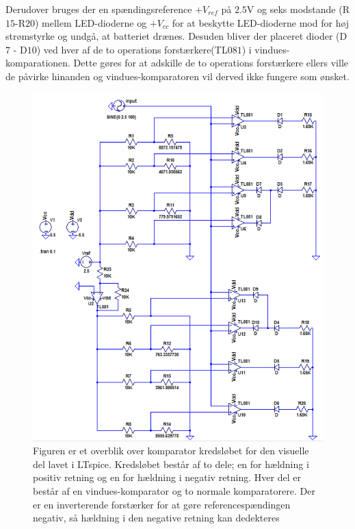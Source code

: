 Derudover bruges der en spændingsreference $+V_{ref}$ på $2.5$V og  seks modstande (R$15$-R$20$) mellem LED-dioderne og $+V_{cc}$ for at beskytte LED-dioderne mod for høj strømstyrke og undgå, at batteriet drænes. Desuden bliver der placeret  dioder (D$7$ - D$10$) ved hver af de to operations forstærkere(TL$081$) i vindues-komparationen. Dette gøres for at adskille de to operations forstærkere ellers ville de påvirke hinanden og vindues-komparatoren vil derved ikke fungere som ønsket.  
\begin{figure}[H]
	\centering
	\includegraphics[scale=1.0]{figures/cProblemloesning/komparator_visuel.PNG}
	\caption{Figuren er et overblik over komparator kredsløbet for den visuelle del lavet i LTspice. Kredsløbet består af to dele; en for hældning i positiv retning og en for hældning i negativ retning. Hver del er består af en vindues-komparator og to normale komparatorere. Der er en inverterende forstærker for at gøre referencespændingen negativ, så hældning i den negative retning kan dedekteres}
	\label{fig:komparator_visuel}
\end{figure}

